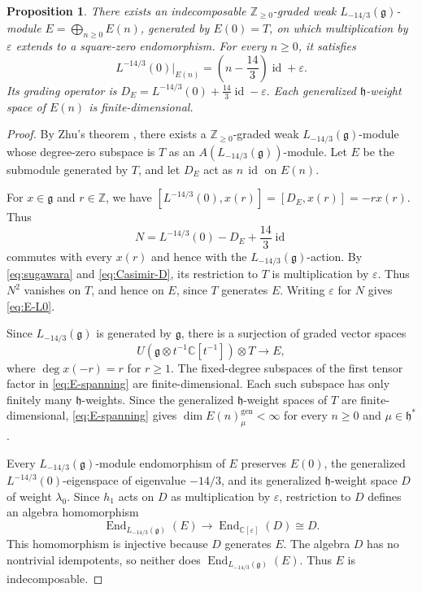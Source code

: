 \documentclass[11pt]{amsart}
\numberwithin{equation}{section}
\newtheorem{proposition}[theorem]{Proposition}
\theoremstyle{definition}
\theoremstyle{remark}
\newcommand{\CC}{\mathbb C}
\newcommand{\ZZ}{\mathbb Z}
\newcommand{\g}{\mathfrak g}
\newcommand{\h}{\mathfrak h}
\newcommand{\id}{\operatorname{id}}
\begin{document}
\begin{proposition}\label{prop:affine-module}
There exists an indecomposable $\mathbb Z_{\geq 0}$-graded weak
$L_{-14/3}(\g)$-module $E=\bigoplus_{n\geq0}E(n)$, generated by
$E(0)=T$, on which multiplication by $\varepsilon$ extends to a
square-zero endomorphism.
For every $n\geq0$, it satisfies
\begin{equation}\label{eq:E-L0}
 L^{-14/3}(0)|_{E(n)}=\left(n-\frac{14}{3}\right)\id+\varepsilon.
\end{equation}
Its grading operator is
$
 D_E=L^{-14/3}(0)+\frac{14}{3}\id-\varepsilon.
$
Each generalized $\h$-weight space of $E(n)$ is finite-dimensional.
\end{proposition}
\begin{proof}
By Zhu's theorem \cite[Theorem~2.2.1]{Zhu}, there exists a
$\mathbb Z_{\geq 0}$-graded weak $L_{-14/3}(\g)$-module whose
degree-zero subspace is $T$ as an $A(L_{-14/3}(\g))$-module.
Let $E$ be the submodule generated by $T$, and let $D_E$ act
as $n\,\id$ on $E(n)$.

For $x\in\g$ and $r\in\ZZ$, we have
$[L^{-14/3}(0),x(r)]=[D_E,x(r)]=-r x(r)$. Thus
\[
 N=L^{-14/3}(0)-D_E+\frac{14}{3}\id
\]
commutes with every $x(r)$ and hence with the $L_{-14/3}(\g)$-action.
By \eqref{eq:sugawara} and
\eqref{eq:Casimir-D}, its restriction to $T$ is multiplication
by $\varepsilon$. Thus $N^2$ vanishes on $T$, and hence on $E$,
since $T$ generates $E$. Writing $\varepsilon$ for $N$ gives
\eqref{eq:E-L0}.


Since $L_{-14/3}(\g)$ is generated by $\g$, there is a
surjection of graded vector spaces
\begin{equation}\label{eq:E-spanning}
 U(\g\otimes t^{-1}\CC[t^{-1}])\otimes T\longrightarrow E,
\end{equation}
where $\deg x(-r)=r$ for $r\geq1$.
The fixed-degree subspaces of the first tensor factor in
\eqref{eq:E-spanning} are finite-dimensional.
Each such subspace has only finitely many $\h$-weights. Since the
generalized $\h$-weight spaces of $T$ are finite-dimensional,
\eqref{eq:E-spanning} gives $\dim E(n)^{\mathrm{gen}}_\mu<\infty$
for every $n\geq0$ and $\mu\in\h^*$.

Every $L_{-14/3}(\g)$-module endomorphism of $E$ preserves
$E(0)$, the generalized $L^{-14/3}(0)$-eigenspace of eigenvalue
$-14/3$, and its generalized $\h$-weight space $D$ of weight
$\lambda_0$. Since $h_1$ acts on $D$ as multiplication by
$\varepsilon$, restriction to $D$ defines an algebra homomorphism
\[
 \operatorname{End}_{L_{-14/3}(\g)}(E)
 \longrightarrow \operatorname{End}_{\CC[\varepsilon]}(D)\cong D.
\]
This homomorphism is injective because $D$ generates $E$.
The algebra $D$ has no nontrivial idempotents, so neither does
$\operatorname{End}_{L_{-14/3}(\g)}(E)$. Thus $E$ is indecomposable.
\end{proof}
\end{document}
